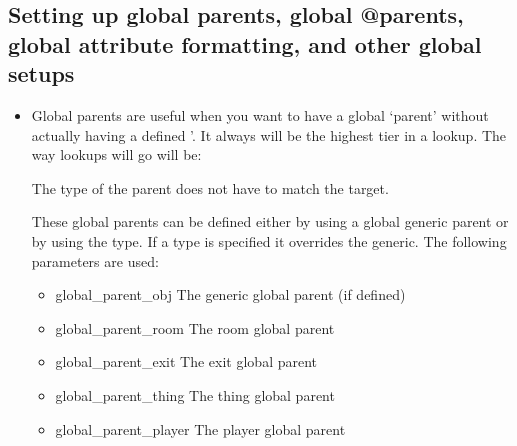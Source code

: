 \documentclass[letterpaper,10pt,english]{sphinxmanual}
\begin{document}
\subsection{Setting up global parents, global @parents, global attribute formatting, and other global setups}
\label{\detokenize{features:setting-up-global-parents-global-parents-global-attribute-formatting-and-other-global-setups}}\begin{itemize}
\item {} 
\sphinxAtStartPar
Global parents are useful when you want to have a global ‘parent’
without actually having a defined ’.  It always will be the
highest tier in a lookup.  The way lookups will go will be:

\begin{sphinxVerbatim}[commandchars=\\\{\}]
\end{sphinxVerbatim}

\sphinxAtStartPar
The type of the parent does not have to match the target.

\sphinxAtStartPar
These global parents can be defined either by using a global
generic parent or by using the type.  If a type is specified it
overrides the generic.  The following parameters are used:
\begin{itemize}
\item {} 
\sphinxAtStartPar
global\_parent\_obj     \sphinxhyphen{} The generic global parent (if defined)

\item {} 
\sphinxAtStartPar
global\_parent\_room    \sphinxhyphen{} The room global parent

\item {} 
\sphinxAtStartPar
global\_parent\_exit    \sphinxhyphen{} The exit global parent

\item {} 
\sphinxAtStartPar
global\_parent\_thing   \sphinxhyphen{} The thing global parent

\item {} 
\sphinxAtStartPar
global\_parent\_player  \sphinxhyphen{} The player global parent

\end{itemize}


\end{itemize}
\end{document}
